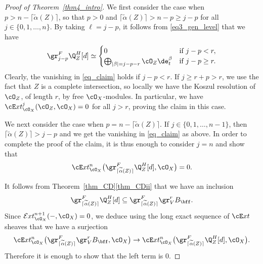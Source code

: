 \begin{proof}[Proof of Theorem~\ref{thm4_intro}]
We first consider the case when $p > n- \lceil \widetilde{\alpha}(Z) \rceil$, so that $p>0$ and $\lceil \widetilde{\alpha}(Z) \rceil > n -p \geq j-p$ for all $j \in \{0,1,\dots, n\}$. By taking $\ell=j-p$, it follows from \eqref{eq3_gen_level} that we have\vspace*{-3pt}
\[ \gr^F_{j-p}\Q^H_Z[d] \simeq \begin{cases}
0& \text{if}\,\,j-p < r, \\
\bigoplus_{|\beta| = j-p -r} \cO_Z \de_t^\beta& \text{if}\,\,j-p \geq r.
\end{cases}\]
Clearly, the vanishing in \eqref{eq_claim} holds if $j-p<r$. If $j\geq r+p > r$, we use the fact that $Z$ is a complete intersection, so
locally we have the Koszul resolution of $\cO_Z$, of length $r$, by free $\cO_X$-modules.
In particular, we have $\cE xt^j_{\cO_X}(\cO_Z,\cO_X) = 0$ for all $j>r$, proving the claim in this case.

We next consider the case when $p = n -\lceil \widetilde{\alpha}(Z) \rceil$. If $j \in \{0,1,\dots, n-1\}$, then $\lceil \widetilde{\alpha}(Z) \rceil>j-p$ and
we get the vanishing in \eqref{eq_claim} as above. In order to complete the proof of the claim, it is thus enough to consider $j=n$ and show that\vspace*{-3pt}
\begin{equation}
\cE xt^n_{\cO_X}\big(\gr^F_{\lceil \widetilde{\alpha}(Z) \rceil} \Q_Z^H[d],\cO_X\big) = 0.
\end{equation}

It follows from Theorem~\ref{thm_CD}\eqref{thm_CDii} that we have an inclusion\vspace*{-3pt}
\[\gr^F_{\lceil \widetilde{\alpha}(Z) \rceil} \Q_Z^H[d] \subseteq \gr^F_{\lceil \widetilde{\alpha}(Z) \rceil} \gr^r_VB_\bff.\]
Since ${\mathcal Ext}_{\cO_X}^{n+1}(-,\cO_X)=0$, we deduce using the long exact sequence of
$\cE xt$ sheaves that we have a surjection\vspace*{-3pt}
\[\cE xt^n_{\cO_X}\big(\gr^F_{\lceil \widetilde{\alpha}(Z) \rceil} \gr^r_V B_\bff,\cO_X\big) \to \cE xt^n_{\cO_X}
\big(\gr^F_{\lceil \widetilde{\alpha}(Z) \rceil}\Q_Z^H[d],\cO_X\big).\]
Therefore it is enough to show that the left term is 0.


\end{proof}

